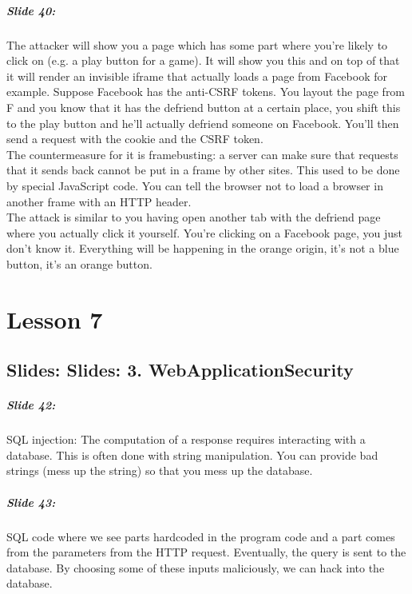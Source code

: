 \documentclass[10pt,a4paper]{report}
\begin{document}
\paragraph{Slide 40:} The attacker will show you a page which has some part where you're likely to click on (e.g. a play button for a game). It will show you this and on top of that it will render an invisible iframe that actually loads a page from Facebook for example. Suppose Facebook has the anti-CSRF tokens. You layout the page from F and you know that it has the defriend button at a certain place, you shift this to the play button and he'll actually defriend someone on Facebook. You'll then send a request with the cookie and the CSRF token. \\
The countermeasure for it is framebusting: a server can make sure that requests that it sends back cannot be put in a frame by other sites. This used to be done by special JavaScript code. You can tell the browser not to load a browser in another frame with an HTTP header.\\ 
The attack is similar to you having open another tab with the defriend page where you actually click it yourself. You're clicking on a Facebook page, you just don't know it. Everything will be happening in the orange origin, it's not a blue button, it's an orange button. 

\chapter{Lesson 7}
\section{Slides: Slides: 3. WebApplicationSecurity}

\paragraph{Slide 42:} SQL injection: The computation of a response requires interacting with a database. This is often done with string manipulation. You can provide bad strings (mess up the string) so that you mess up the database. 

\paragraph{Slide 43:} SQL code where we see parts hardcoded in the program code and a part comes from the parameters from the HTTP request. Eventually, the query is sent to the database. By choosing some of these inputs maliciously, we can hack into the database.
\end{document}
